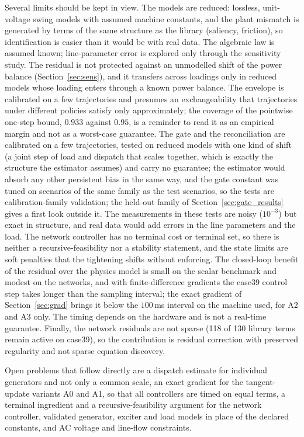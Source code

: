 \documentclass[preprint,12pt]{elsarticle}
\begin{document}
Several limits should be kept in view. The models are reduced: lossless, unit-voltage swing models with assumed machine constants, and the plant mismatch is generated by terms of the same structure as the library (saliency, friction), so identification is easier than it would be with real data. The algebraic law is assumed known; line-parameter error is explored only through the sensitivity study. The residual is not protected against an unmodelled shift of the power balance (Section~\ref{sec:sens}), and it transfers across loadings only in reduced models whose loading enters through a known power balance. The envelope is calibrated on a few trajectories and presumes an exchangeability that trajectories under different policies satisfy only approximately; the coverage of the pointwise one-step bound, $0.933$ against $0.95$, is a reminder to read it as an empirical margin and not as a worst-case guarantee. The gate and the reconciliation are calibrated on a few trajectories, tested on reduced models with one kind of shift (a joint step of load and dispatch that scales together, which is exactly the structure the estimator assumes) and carry no guarantee; the estimator would absorb any other persistent bias in the same way, and the gate constant was tuned on scenarios of the same family as the test scenarios, so the tests are calibration-family validation; the held-out family of Section~\ref{sec:gate_results} gives a first look outside it. The measurements in these tests are noisy ($10^{-3}$) but exact in structure, and real data would add errors in the line parameters and the load. The network controller has no terminal cost or terminal set, so there is neither a recursive-feasibility nor a stability statement, and the state limits are soft penalties that the tightening shifts without enforcing. The closed-loop benefit of the residual over the physics model is small on the scalar benchmark and modest on the networks, and with finite-difference gradients the case39 control step takes longer than the sampling interval; the exact gradient of Section~\ref{sec:grad} brings it below the $100$\,ms interval on the machine used, for A2 and A3 only. The timing depends on the hardware and is not a real-time guarantee. Finally, the network residuals are not sparse (118 of 130 library terms remain active on case39), so the contribution is residual correction with preserved regularity and not sparse equation discovery.

Open problems that follow directly are a dispatch estimate for individual generators and not only a common scale, an exact gradient for the tangent-update variants A0 and A1, so that all controllers are timed on equal terms, a terminal ingredient and a recursive-feasibility argument for the network controller, validated generator, exciter and load models in place of the declared constants, and AC voltage and line-flow constraints.
\end{document}
